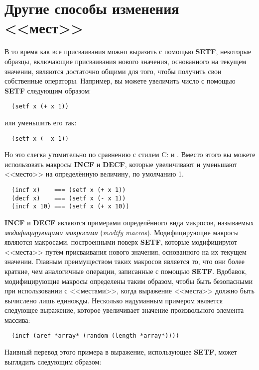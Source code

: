 \section{Другие способы изменения <<мест>>}

В то время как все присваивания можно выразить с помощью \textbf{SETF}, некоторые образцы,
включающие присваивания нового значения, основанного на текущем значении, являются
достаточно общими для того, чтобы получить свои собственные операторы. Например, вы можете
увеличить число с помощью \textbf{SETF} следующим образом:

\begin{lstlisting}
  (setf x (+ x 1))
\end{lstlisting}

или уменьшить его так:

\begin{lstlisting}
  (setf x (- x 1))
\end{lstlisting}

Но это слегка утомительно по сравнению с стилем C:  и . Вместо этого
вы можете использовать макросы \textbf{INCF} и \textbf{DECF}, которые увеличивают и
уменьшают <<место>> на определённую величину, по умолчанию 1.

\begin{lstlisting}
  (incf x)    === (setf x (+ x 1))
  (decf x)    === (setf x (- x 1))
  (incf x 10) === (setf x (+ x 10))
\end{lstlisting}

\textbf{INCF} и \textbf{DECF} являются примерами определённого вида макросов, называемых
\textit{модифицирующими макросами} (\textit{modify macros}). Модифицирующие макросы
являются макросами, построенными поверх \textbf{SETF}, которые модифицируют <<места>> путём
присваивания нового значения, основанного на их текущем значении. Главным преимуществом
таких макросов является то, что они более краткие, чем аналогичные операции, записанные с
помощью \textbf{SETF}. Вдобавок, модифицирующие макросы определены таким образом, чтобы
быть безопасными при использовании с <<местами>>, когда выражение <<места>> должно быть
вычислено лишь единожды. Несколько надуманным примером является следующее выражение,
которое увеличивает значение произвольного элемента массива:

\begin{lstlisting}
  (incf (aref *array* (random (length *array*))))
\end{lstlisting}

Наивный перевод этого примера в выражение, использующее \textbf{SETF}, может выглядить
следующим образом:

